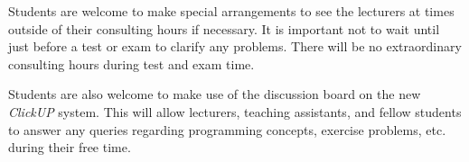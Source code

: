         Students are welcome to make special arrangements to see the
        lecturers at times outside of their consulting hours if
        necessary. It is important not to wait until just before a
        test or exam to clarify any problems. There will be no
        extraordinary consulting hours during test and exam time.

        Students are also welcome to make use of the discussion board
        on the new {\it ClickUP} system. This will allow lecturers,
        teaching assistants, and fellow students to answer any queries
        regarding programming concepts, exercise problems, etc. during
        their free time.
